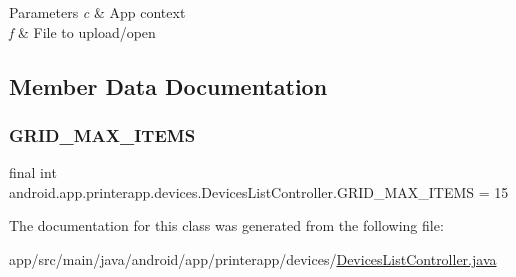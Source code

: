 \begin{DoxyParams}{Parameters}
{\em c} & App context \\
\hline
{\em f} & File to upload/open \\
\hline
\end{DoxyParams}


\subsection{Member Data Documentation}
\mbox{\label{classandroid_1_1app_1_1printerapp_1_1devices_1_1_devices_list_controller_a146668de386ede76b9fd4fb9ca6127fc}} 
\subsubsection{\texorpdfstring{G\+R\+I\+D\+\_\+\+M\+A\+X\+\_\+\+I\+T\+E\+MS}{GRID\_MAX\_ITEMS}}
{\footnotesize\ttfamily final int android.\+app.\+printerapp.\+devices.\+Devices\+List\+Controller.\+G\+R\+I\+D\+\_\+\+M\+A\+X\+\_\+\+I\+T\+E\+MS = 15\hspace{0.3cm}{\ttfamily [static]}}



The documentation for this class was generated from the following file\+:\begin{DoxyCompactItemize}
\item 
app/src/main/java/android/app/printerapp/devices/\hyperlink{_devices_list_controller_8java}{Devices\+List\+Controller.\+java}\end{DoxyCompactItemize}
